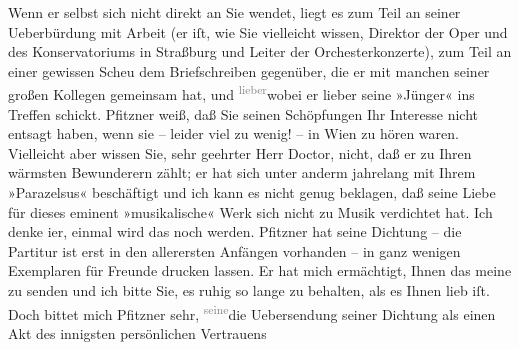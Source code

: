 \begin{ledgroupsized}[t]{13cm}
           \pstart
           Wenn er selbst sich nicht direkt an Sie wendet, liegt es zum Teil an seiner
                    Ueberbürdung mit Arbeit (er iſt, wie Sie vielleicht wissen, Direktor der Oper und des Konservatoriums in Straßburg und
                    Leiter der Orchesterkonzerte), zum Teil an
                    einer gewissen Scheu dem Briefschreiben gegenüber, die er mit {\pb}manchen seiner großen Kollegen gemeinsam hat, und \substVorne{}\textsuperscript{\textcolor{gray}{lieber}}{\allowbreak}\substDazwischen{}wobei\substHinten{} er lieber seine »Jünger« ins Treffen schickt.\pend
           \pstart
           Pfitzner weiß, daß Sie seinen Schöpfungen Ihr
                    Interesse nicht entsagt haben, wenn sie – leider viel zu wenig! – in Wien zu hören waren. Vielleicht aber wissen Sie,
                    sehr geehrter Herr Doctor, nicht, daß er zu Ihren wärmsten Bewunderern zählt; er
                    hat sich unter anderm jahrelang mit Ihrem »Parazelsus« beschäftigt und ich kann es nicht genug beklagen, daß
                    seine Liebe für dieses eminent »musikalische« Werk sich nicht zu Musik
                    verdichtet hat. Ich denke i{\geminationm}er, einmal wird das
                    noch werden.\pend
           \pstart
           Pfitzner hat seine Dichtung – die Partitur ist erst in den
                    allerersten Anfängen vorhanden – in ganz wenigen Exemplaren für Freunde drucken
                    lassen. Er hat mich ermächtigt, Ihnen das meine zu senden und ich bitte Sie, es
                    ruhig so lange zu behalten, als es Ihnen lieb iſt. Doch bittet mich Pfitzner sehr, \substVorne{}\textsuperscript{\textcolor{gray}{seine}}\substDazwischen{}die Ueber\substHinten{}sendung seiner Dichtung als einen Akt des innigsten persönlichen Vertrauens

\end{ledgroupsized}
